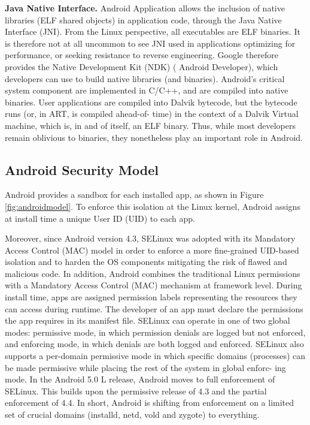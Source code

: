 \textbf{Java Native Interface.} Android Application allows the inclusion of native libraries (ELF shared objects) in application code, through the Java Native Interface (JNI).
From the Linux perspective, all executables are ELF binaries. It is therefore not at all uncommon to see JNI used in applications optimizing for performance, or seeking resistance to reverse engineering. Google therefore provides the Native Development Kit (NDK) (                Android Developer), which developers can use to build native libraries (and binaries). Android's critical system  component are implemented in C/C++, and are compiled into native binaries. User applications are compiled into Dalvik bytecode, but the bytecode runs (or, in ART, is compiled ahead-of- time) in the context of a Dalvik Virtual machine, which is, in and of itself, an ELF binary. Thus, while most developers remain oblivious to binaries, they nonetheless play an important role in Android.



\subsection*{Android Security Model} 
Android provides a sandbox for each installed app, as shown in Figure \ref{fig:androidmodel}. To enforce this isolation at the Linux kernel, Android assigns at install time a unique User ID (UID) to each app. 

Moreover, since Android version 4.3, SELinux was adopted with its Mandatory Access Control (MAC) model in order  to enforce a more fine-grained UID-based isolation and to harden the OS components mitigating the risk of flawed and malicious code.  In addition, Android combines the traditional Linux permissions with a Mandatory Access Control (MAC) mechanism at framework level. During install time, apps are assigned permission labels representing the resources they can access during runtime. The developer of an app must declare the permissions the app requires in its manifest file. SELinux can operate in one of two global modes: permissive mode, in which permission denials are logged but not enforced, and enforcing mode, in which denials are both logged and enforced. SELinux also supports a per-domain permissive mode in which specific domains (processes) can be made permissive while placing the rest of the system in global enforc- ing mode. In the Android 5.0 L release, Android moves to full enforcement of SELinux. This builds upon the permissive release of 4.3 and the partial enforcement of 4.4. In short, Android is shifting from enforcement on a limited set of crucial domains (installd, netd, vold and zygote) to everything.

